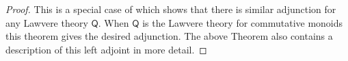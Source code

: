 \begin{proof}
    This is a special case of \cite[Thm.\ 5.1]{GeneralizedPetriNets} which shows that there is similar adjunction for any Lawvere theory $\mathsf{Q}$. When $\mathsf{Q}$ is the Lawvere theory for commutative monoids this theorem gives the desired adjunction. The above Theorem also contains a description of this left adjoint in more detail. 
\end{proof}
